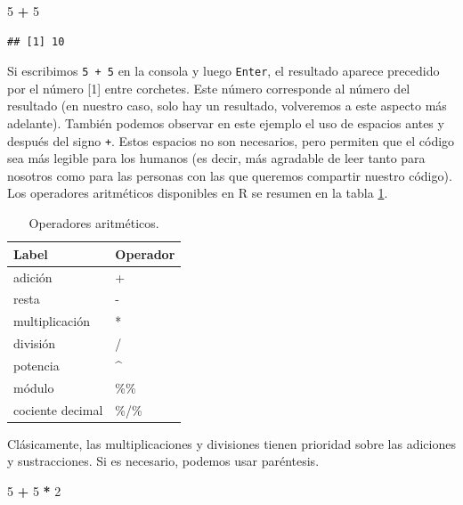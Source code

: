 \documentclass[]{book}
\newenvironment{Shaded}{\begin{snugshade}}{\end{snugshade}}
\newcommand{\DecValTok}[1]{\textcolor[rgb]{0.00,0.00,0.81}{#1}}
\newcommand{\StringTok}[1]{\textcolor[rgb]{0.31,0.60,0.02}{#1}}
\newcommand{\OperatorTok}[1]{\textcolor[rgb]{0.81,0.36,0.00}{\textbf{#1}}}
\begin{document}
\begin{Shaded}
\begin{Highlighting}[]
\DecValTok{5} \OperatorTok{+}\StringTok{ }\DecValTok{5}
\end{Highlighting}
\end{Shaded}

\begin{verbatim}
## [1] 10
\end{verbatim}

Si escribimos \texttt{5\ +\ 5} en la consola y luego \texttt{Enter}, el
resultado aparece precedido por el número {[}1{]} entre corchetes. Este
número corresponde al número del resultado (en nuestro caso, solo hay un
resultado, volveremos a este aspecto más adelante). También podemos
observar en este ejemplo el uso de espacios antes y después del signo
\texttt{+}. Estos espacios no son necesarios, pero permiten que el
código sea más legible para los humanos (es decir, más agradable de leer
tanto para nosotros como para las personas con las que queremos
compartir nuestro código). Los operadores aritméticos disponibles en R
se resumen en la tabla \ref{tab:tabOpAri}.

\begin{table}

\caption{\label{tab:tabOpAri}Operadores aritméticos.\label{tab:tabOpAri}}
\centering
\begin{tabular}[t]{l|l}
\hline
Label & Operador\\
\hline
adición & +\\
\hline
resta & -\\
\hline
multiplicación & *\\
\hline
división & /\\
\hline
potencia & \textasciicircum{}\\
\hline
módulo & \%\%\\
\hline
cociente decimal & \%/\%\\
\hline
\end{tabular}
\end{table}

Clásicamente, las multiplicaciones y divisiones tienen prioridad sobre
las adiciones y sustracciones. Si es necesario, podemos usar paréntesis.

\begin{Shaded}
\begin{Highlighting}[]
\DecValTok{5} \OperatorTok{+}\StringTok{ }\DecValTok{5} \OperatorTok{*}\StringTok{ }\DecValTok{2}
\end{Highlighting}
\end{Shaded}
\end{document}
